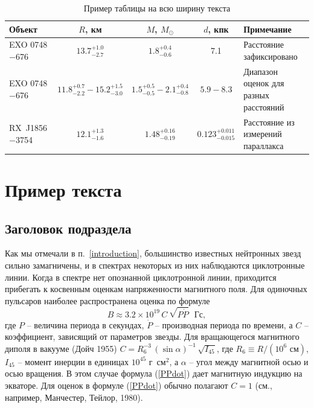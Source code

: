 \documentclass{pazh2col-win}
\begin{document}
\begin{table}[ht]
\begin{center}
\caption{Пример таблицы на всю ширину текста}
\label{tab2}
\begin{tabular*}{\textwidth}{l|c|c|c| p{}}
\hline
Объект & $R$, км
             & $M$, $M_\odot$ 
             & $d$, кпк
             & Примечание
\\
\hline
EXO 0748$-$676 & $13.7^{+1.0}_{-2.7}$
             & $1.8^{+0.4}_{-0.6}$
             & 7.1
             & Расстояние зафиксировано
\\
EXO 0748$-$676 & $11.8^{+0.7}_{-2.2}-15.2^{+1.5}_{-3.0}$
             & $1.5^{+0.5}_{-0.5}-2.1^{+0.4}_{-0.8}$
             & $5.9-8.3$ 
             & Диапазон оценок для разных расстояний
\\
RX~J1856$-$3754 & $12.1^{+1.3}_{-1.6}$
             & $1.48^{+0.16}_{-0.19}$
             & $0.123^{+0.011}_{-0.015}$
             & Расстояние из измерений параллакса
\\
\hline
\end{tabular*}
\end{center}
\end{table}


\section{Пример текста}
\label{section_A}

\subsection{Заголовок подраздела}

Как мы отмечали в п.~\ref{introduction}, большинство известных нейтронных звезд
сильно замагничены, и в спектрах некоторых из них наблюдаются циклотронные линии.
Когда в спектре нет опознанной циклотронной линии,
приходится прибегать к косвенным оценкам напряженности магнитного поля.
Для одиночных пульсаров наиболее распространена
оценка по формуле
\begin{equation}
B \approx 3.2\times10^{19} \,C\,
 \sqrt{{P}\dot{{P}}}\textrm{~~Гс},
\label{PPdot} 
\end{equation}
где 
${P}$ -- величина периода в секундах, 
$\dot{{P}}$ -- производная периода по времени, а
$C$ -- коэффициент, зависящий от параметров звезды. Для
вращающегося магнитного диполя в вакууме (Дойч 1955)
$C=R_6^{-3}\,(\sin\alpha)^{-1}\,\sqrt{I_{45}}$, где
$R_6\equiv R/(10^6\mbox{~см})$, $I_{45}$ -- момент инерции в
единицах $10^{45}$ г~см$^2$, а $\alpha$ -- угол между
магнитной осью и осью вращения. В этом случае формула
(\ref{PPdot}) дает магнитную индукцию на экваторе. 
Для оценок в формуле
(\ref{PPdot}) обычно полагают $C=1$ (см., например, Манчестер, Тейлор, 1980).
\end{document}
